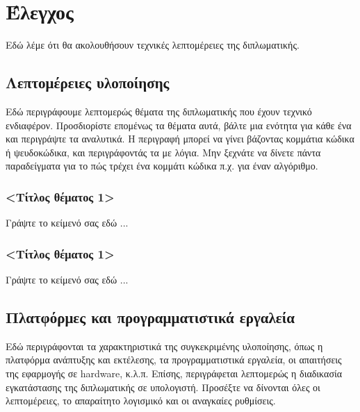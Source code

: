 \chapter{Έλεγχος}
\label{chap6}

Εδώ λέμε ότι θα ακολουθήσουν τεχνικές λεπτομέρειες της διπλωματικής.

\section{Λεπτομέρειες υλοποίησης}

Εδώ περιγράφουμε λεπτομερώς θέματα της διπλωματικής που έχουν τεχνικό ενδιαφέρον. Προσδιορίστε επομένως τα θέματα αυτά, βάλτε μια ενότητα για κάθε ένα και περιγράψτε τα αναλυτικά. Η περιγραφή μπορεί να γίνει βάζοντας κομμάτια κώδικα ή ψευδοκώδικα, και περιγράφοντάς τα με λόγια. Μην ξεχνάτε να δίνετε πάντα παραδείγματα για το πώς τρέχει ένα κομμάτι κώδικα π.χ. για έναν αλγόριθμο.

\subsection{<Τίτλος θέματος 1>}
Γράψτε το κείμενό σας εδώ ...

\subsection{<Τίτλος θέματος 1>}
Γράψτε το κείμενό σας εδώ ...

\section{Πλατφόρμες και προγραμματιστικά εργαλεία}

Εδώ περιγράφονται τα χαρακτηριστικά της συγκεκριμένης υλοποίησης, όπως η πλατφόρμα ανάπτυξης και εκτέλεσης, τα προγραμματιστικά εργαλεία, οι απαιτήσεις της εφαρμογής σε hardware, κ.λ.π. Επίσης, περιγράφεται λεπτομερώς η διαδικασία εγκατάστασης της διπλωματικής σε υπολογιστή. Προσέξτε να δίνονται όλες οι λεπτομέρειες, το απαραίτητο λογισμικό και οι αναγκαίες ρυθμίσεις.
